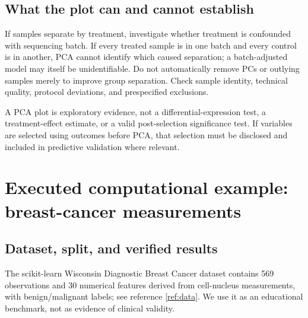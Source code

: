 \documentclass[11pt]{article}
\begin{document}
\subsection{What the plot can and cannot establish}
If samples separate by treatment, investigate whether treatment is confounded with sequencing batch. If every treated sample is in one batch and every control is in another, PCA cannot identify which caused separation; a batch-adjusted model may itself be unidentifiable. Do not automatically remove PCs or outlying samples merely to improve group separation. Check sample identity, technical quality, protocol deviations, and prespecified exclusions.

A PCA plot is exploratory evidence, not a differential-expression test, a treatment-effect estimate, or a valid post-selection significance test. If variables are selected using outcomes before PCA, that selection must be disclosed and included in predictive validation where relevant.

\section{Executed computational example: breast-cancer measurements}
\subsection{Dataset, split, and verified results}
The scikit-learn Wisconsin Diagnostic Breast Cancer dataset contains 569 observations and 30 numerical features derived from cell-nucleus measurements, with benign/malignant labels; see reference \ref{ref:data}. We use it as an educational benchmark, not as evidence of clinical validity.
\end{document}
